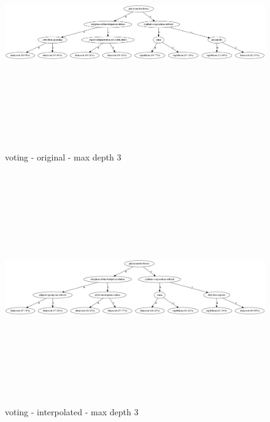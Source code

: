 \documentclass{sig-alternate}
\begin{document}
\clearpage
\begin{figure}[!t]
    \centering
    \includegraphics[width=1.00\textwidth,height=10cm,keepaspectratio]{./images/votingD3Original.png}
    \caption{voting - original - max depth 3}
    \label{figure:votingD3Original}
\end{figure}
\begin{figure}[h]
    \centering
    \includegraphics[width=1.00\textwidth,height=10cm,keepaspectratio]{./images/votingD3New.png}
    \caption{voting - interpolated - max depth 3}
    \label{figure:votingD3New}
\end{figure}

\end{document}
